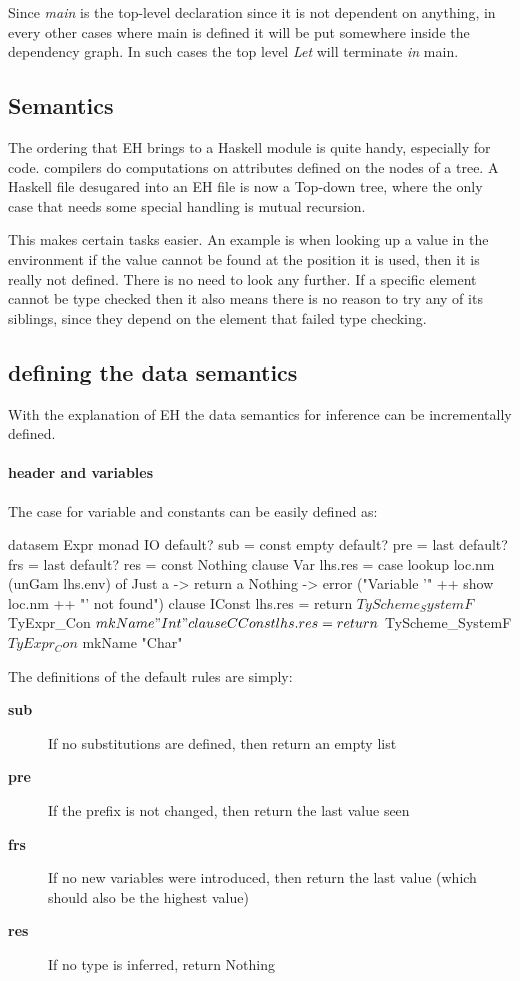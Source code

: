 Since \emph{main} is the top-level declaration since it is not dependent on anything, in every other cases where main is defined it will be put somewhere inside the dependency graph. In such cases the top level \emph{Let} will terminate \emph{in} main.
\subsection{Semantics}

The ordering that EH brings to a Haskell module is quite handy, especially for \ag code. \ag compilers do computations on attributes defined on the nodes of a tree. A Haskell file desugared into an EH file is now a Top-down tree, where the only case that needs some special handling is mutual recursion. 

This makes certain tasks easier. An example is when looking up a value in the environment if the value cannot be found at the position it is used, then it is really not defined. There is no need to look any further. If a specific element cannot be type checked then it also means there is no reason to try any of its siblings, since they depend on the element that failed type checking.

\subsection{defining the data semantics}
With the explanation of EH the data semantics for inference can be incrementally defined.

\paragraph{header and variables}
The case for variable and constants can be easily defined as:
\begin{code}
datasem Expr monad IO
    default? sub = const empty
    default? pre = last
    default? frs = last
    default? res = const Nothing
    clause Var
        lhs.res =
          case lookup loc.nm (unGam lhs.env) of
           Just a  -> return a
           Nothing -> error ("Variable '" ++ show loc.nm ++ "' not found")
    clause IConst
       lhs.res = return $ TyScheme_SystemF $ TyExpr_Con $ mkName "Int"
    clause CConst
       lhs.res = return $ TyScheme_SystemF $ TyExpr_Con $ mkName "Char"
\end{code}

The definitions of the default rules are simply:
\begin{description}
\item[\textbf{sub}] If no substitutions are defined, then return an empty list
\item[\textbf{pre}] If the prefix is not changed, then return the last value seen
\item[\textbf{frs}] If no new variables were introduced, then return the last value (which should also be the highest value)
\item[\textbf{res}] If no type is inferred, return Nothing
\end{description}

